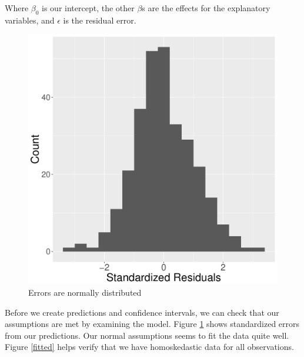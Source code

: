 \documentclass{article}
\begin{document}
Where $\beta_0$ is our intercept, the other $\beta$s are the effects for the explanatory variables, and $\epsilon$ is the residual error.
\begin{figure}
\centering
\includegraphics[scale=.3]{resids.pdf}
\caption{Errors are normally distributed}
\label{resid}
\end{figure}

Before we create predictions and confidence intervals, we can check that our assumptions are met by examining the model. Figure \ref{resid} shows standardized errors from our predictions. Our normal assumptions seems to fit the data quite well. Figure \ref{fitted} helps verify that we have homoskedastic data for all observations.  
\end{document}
